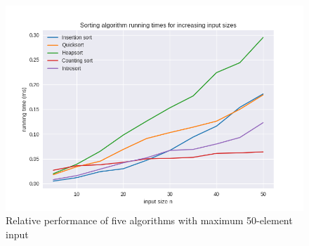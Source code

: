 \documentclass[12pt, a4paper]{article}
\begin{document}
\begin{figure}
    \includegraphics[width=\linewidth]{bm_output/plot_0_linear_20210513-234313.png}
    \caption{Relative performance of five algorithms with maximum 50-element input}
    \label{fig:fifty}
\end{figure}



\clearpage

\printbibliography
\end{document}
